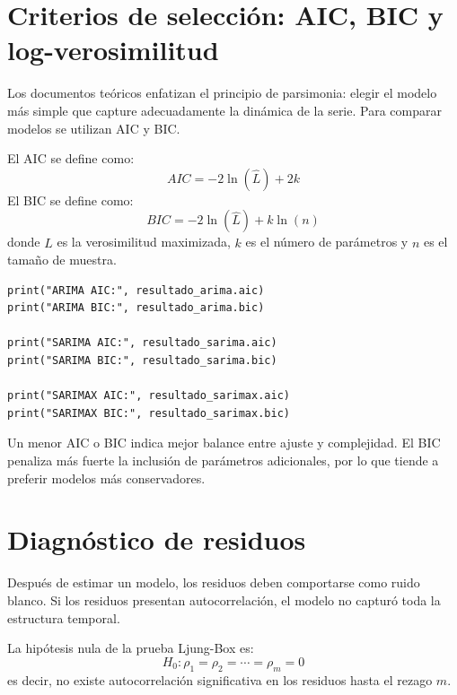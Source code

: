 \documentclass[12pt,a4paper]{article}
\begin{document}
\section{Criterios de selección: AIC, BIC y log-verosimilitud}

\begin{markdowncell}
Los documentos teóricos enfatizan el principio de parsimonia: elegir el modelo más simple que capture adecuadamente la dinámica de la serie. Para comparar modelos se utilizan AIC y BIC.
\end{markdowncell}

\begin{latexcell}
El AIC se define como:
\[
AIC = -2\ln(\hat{L}) + 2k
\]
El BIC se define como:
\[
BIC = -2\ln(\hat{L}) + k\ln(n)
\]
donde \(\hat{L}\) es la verosimilitud maximizada, \(k\) es el número de parámetros y \(n\) es el tamaño de muestra.
\end{latexcell}

\begin{lstlisting}[style=pythonstyle]
print("ARIMA AIC:", resultado_arima.aic)
print("ARIMA BIC:", resultado_arima.bic)

print("SARIMA AIC:", resultado_sarima.aic)
print("SARIMA BIC:", resultado_sarima.bic)

print("SARIMAX AIC:", resultado_sarimax.aic)
print("SARIMAX BIC:", resultado_sarimax.bic)
\end{lstlisting}

\begin{interpretacion}
Un menor AIC o BIC indica mejor balance entre ajuste y complejidad. El BIC penaliza más fuerte la inclusión de parámetros adicionales, por lo que tiende a preferir modelos más conservadores.
\end{interpretacion}

\section{Diagnóstico de residuos}

\begin{markdowncell}
Después de estimar un modelo, los residuos deben comportarse como ruido blanco. Si los residuos presentan autocorrelación, el modelo no capturó toda la estructura temporal.
\end{markdowncell}

\begin{latexcell}
La hipótesis nula de la prueba Ljung-Box es:
\[
H_0: \rho_1=\rho_2=\cdots=\rho_m=0
\]
es decir, no existe autocorrelación significativa en los residuos hasta el rezago \(m\).
\end{latexcell}
\end{document}
